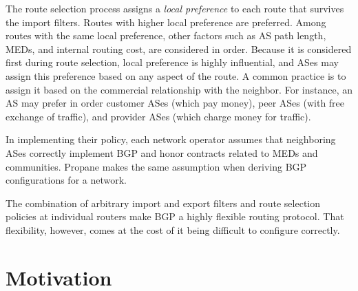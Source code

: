 \documentclass[10pt]{sigalternate052015} %
\newcommand{\sysname}{{\small \sf Propane}\xspace}
\begin{document}
The route selection process assigns a {\em local preference} to each
route that survives the import filters. Routes with higher local
preference are preferred. Among routes with the same local preference,
other factors such as AS path length, MEDs, and internal routing cost, are considered in order. Because it is considered first during route selection, local preference is highly influential, and ASes may assign this preference based on any aspect of the route. A common practice is to assign it based on the commercial relationship with the neighbor. For instance, an AS may prefer in order customer ASes (which pay money), peer ASes (with free exchange of traffic), and provider ASes (which charge money for traffic).

In implementing their policy, each network operator assumes that
neighboring ASes correctly implement BGP and honor contracts related
to MEDs and communities. \sysname makes the same assumption when
deriving BGP configurations for a network.

The combination of arbitrary import and export filters and route selection policies at individual routers make BGP a highly flexible routing protocol. That flexibility, however, comes at the cost of it being difficult to configure correctly.




%
%
%
%

\section{Motivation}
\label{sec:motivation}
\end{document}
